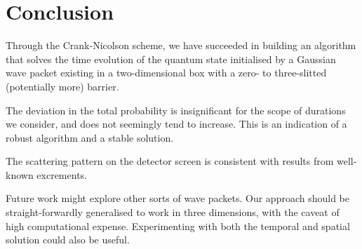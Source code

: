 \section{Conclusion}\label{sec:conclusion}

Through the Crank-Nicolson scheme, we have succeeded in building an algorithm that solves the time evolution of the quantum state initialised by a Gaussian wave packet existing in a two-dimensional box with a zero- to three-slitted (potentially more) barrier.

The deviation in the total probability is insignificant for the scope of durations we consider, and does not seemingly tend to increase. This is an indication of a robust algorithm and a stable solution.

The scattering pattern on the detector screen is consistent with results from well-known excrements.

Future work might explore other sorts of wave packets. Our approach should be straight-forwardly generalised to work in three dimensions, with the caveat of high computational expense. Experimenting with both the temporal and spatial solution could also be useful.



